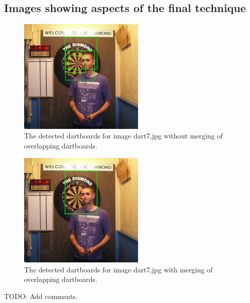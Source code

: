 \documentclass[conference]{IEEEtran}
\begin{document}
\subsection{Images showing aspects of the final technique}

\begin{figure}[ht!]
	\centering
	\includegraphics[width=60mm]{img/Task4_Images/detected_dart7_unmerged.jpg}
	\caption{The detected dartboards for image dart7.jpg without merging of overlapping dartboards.}
\end{figure}

\begin{figure}[ht!]
	\centering
	\includegraphics[width=60mm]{img/Task4_Images/detected_dart7_merged.jpg}
	\caption{The detected dartboards for image dart7.jpg with merging of overlapping dartboards.}
\end{figure}

TODO: Add comments.
\end{document}
